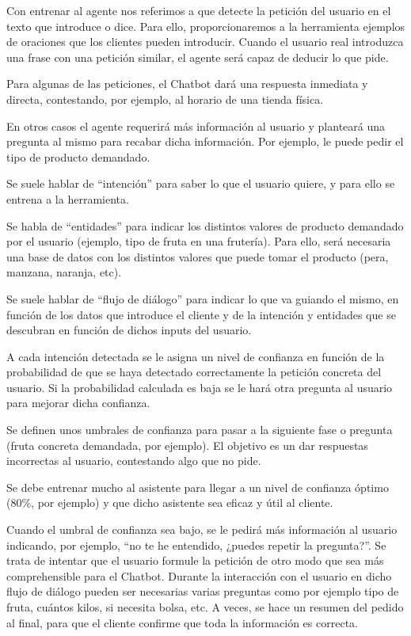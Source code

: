 Con entrenar al agente nos referimos a que detecte la petición del usuario en el texto que introduce o dice. Para ello, proporcionaremos a la herramienta ejemplos de oraciones que los clientes pueden introducir. Cuando el usuario real introduzca una frase con una petición similar, el agente será capaz de deducir lo que pide.

Para algunas de las peticiones, el Chatbot dará una respuesta inmediata y directa, contestando, por ejemplo, al horario de una tienda física.

En otros casos el agente requerirá más información al usuario y planteará una pregunta al mismo para recabar dicha información. Por ejemplo, le puede pedir el tipo de producto demandado.

Se suele hablar de “intención” para saber lo que el usuario quiere, y para ello se entrena a la herramienta.

Se habla de “entidades” para indicar los distintos valores de producto demandado por el usuario (ejemplo, tipo de fruta en una frutería). Para ello, será necesaria una base de datos con los distintos valores que puede tomar el producto (pera, manzana, naranja, etc).

Se suele hablar de “flujo de diálogo” para indicar lo que va guiando el mismo, en función de los datos que introduce el cliente y de la intención y entidades que se descubran en función de dichos inputs del usuario.

A cada intención detectada se le asigna un nivel de confianza en función de la probabilidad de que se haya detectado correctamente la petición concreta del usuario. Si la probabilidad calculada es baja se le hará otra pregunta al usuario para mejorar dicha confianza.

Se definen unos umbrales de confianza para pasar a la siguiente fase o pregunta (fruta concreta demandada, por ejemplo). El objetivo es un dar respuestas incorrectas al usuario, contestando algo que no pide. 

Se debe entrenar mucho al asistente para llegar a un nivel de confianza óptimo (80\%, por ejemplo) y que dicho asistente sea eficaz y útil al cliente.

Cuando el umbral de confianza sea bajo, se le pedirá más información al usuario indicando, por ejemplo, “no te he entendido, ¿puedes repetir la pregunta?”. Se trata de intentar que el usuario formule la petición de otro modo que sea más comprehensible para el Chatbot.
Durante la interacción con el usuario en dicho flujo de diálogo pueden ser necesarias varias preguntas como por ejemplo tipo de fruta, cuántos kilos, si necesita bolsa, etc. A veces, se hace un resumen del pedido al final, para que el cliente confirme que toda la información es correcta. 

